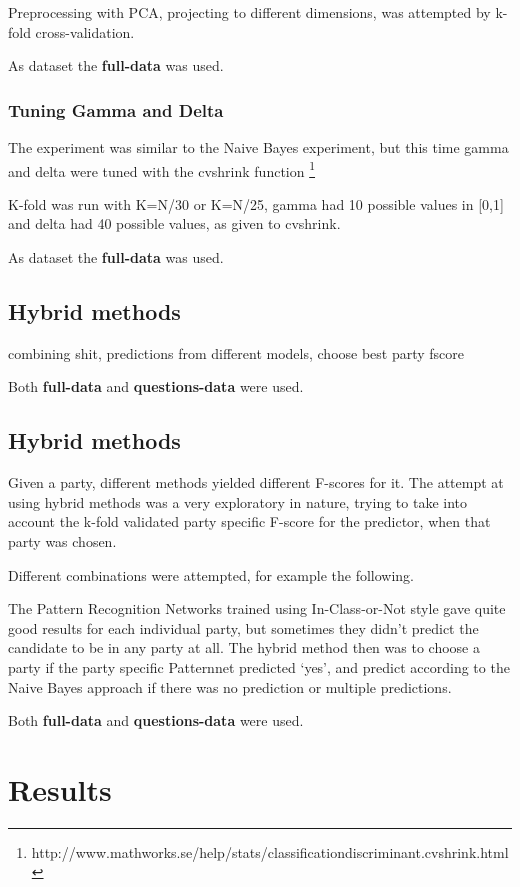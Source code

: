 \documentclass[a4paper,10pt]{article}
\begin{document}
Preprocessing with PCA, projecting to different dimensions, was attempted by k-fold cross-validation.

As dataset the {\bf full-data} was used.

\subsubsection{Tuning Gamma and Delta}

The experiment was similar to the Naive Bayes experiment, but this time gamma and delta were tuned with the cvshrink function
\footnote{http://www.mathworks.se/help/stats/classificationdiscriminant.cvshrink.html}

K-fold was run with K=N/30 or K=N/25, gamma had 10 possible values in [0,1] and delta had 40 possible values, as given to cvshrink.

As dataset the {\bf full-data} was used.

\subsection{Hybrid methods}
combining shit, predictions from different models, choose best party fscore

Both {\bf full-data} and {\bf questions-data} were used.

\subsection{Hybrid methods}
Given a party, different methods yielded different F-scores for it. The attempt at using hybrid methods was a very exploratory in nature, trying to take into account the k-fold validated party specific F-score for the predictor, when that party was chosen.

Different combinations were attempted, for example the following.

The Pattern Recognition Networks trained using In-Class-or-Not style gave quite good results for each individual party, but sometimes they didn’t predict the candidate to be in any party at all. The hybrid method then was to choose a party if the party specific Patternnet predicted ‘yes’, and predict according to the Naive Bayes approach if there was no prediction or multiple predictions.

Both {\bf full-data} and {\bf questions-data} were used.

\section{Results}
\end{document}
